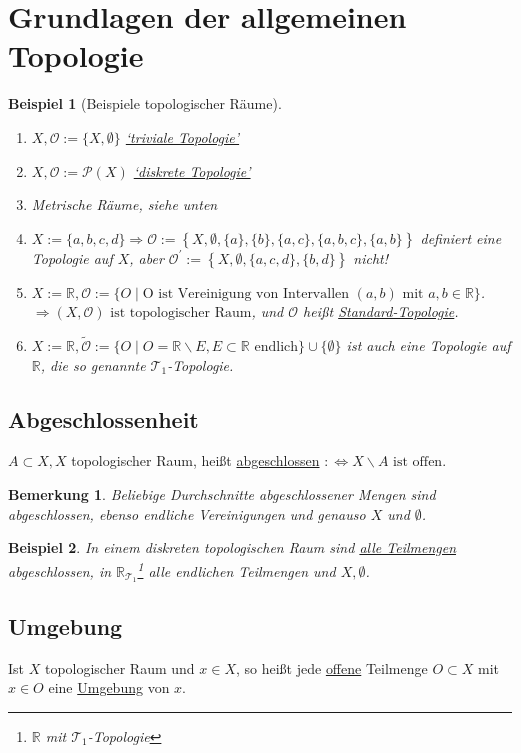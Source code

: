 \documentclass[a4paper,11pt,notitlepage]{report}
\newtheorem{remark}{Bemerkung}[chapter]
\newtheorem{example}{Beispiel}[chapter]
\newcommand{\R}{{\ensuremath{\mathbb{R}}}}
\newcommand{\OO}{{\ensuremath{\mathcal{O}}}}
\newenvironment{Kasten}[1]
{
\hspace{0.05\linewidth}
\begin{center}
\begin{minipage}{0.9\linewidth}
\setlength{\fboxsep}{10pt}
\definecolor{shadecolor}{gray}{1}
\definecolor{framecolor}{gray}{0}
\def\FrameCommand{\fcolorbox{framecolor}{shadecolor}}
\MakeFramed {\FrameRestore}
\subsection{#1}
\begin{itshape}
}
{
\end{itshape}
\endMakeFramed
\end{minipage}
\end{center}
}
\begin{document}
\section{Grundlagen der allgemeinen Topologie}
\begin{example}[Beispiele topologischer Räume]
	\begin{enumerate}[(1)]
		\item $X, \OO := \{X, \emptyset\}$ \underline{`triviale Topologie'}
		\item $X, \OO := \mathcal{P}(X)$ \underline{`diskrete Topologie'}
		\item Metrische Räume, siehe unten
		\item $X:= \{a,b,c,d\} \Rightarrow \OO := \left\{X, \emptyset, \{a\}, \{b\}, \{a,c\}, \{a,b,c\}, \{a,b\} \right \}$ definiert eine Topologie auf $X$, aber $\OO^\prime:= \left \{ X, \emptyset, \{a,c,d\}, \{b,d\} \right \}$ nicht!
		\item $X := \R, \OO := \{O \mid \text{O ist Vereinigung von Intervallen } (a,b) \text{ mit } a,b \in \R\}$. $\Rightarrow (X, \OO) \text{ ist topologischer Raum}$, und $\OO$ heißt \underline{Standard-Topologie}.
		\item $X:= \R, \tilde{\OO} := \{O \mid O = \R \backslash E, E \subset \R \text{ endlich}\} \cup \{\emptyset\}$ ist auch eine Topologie auf $\R$, die so genannte $\mathcal{T}_1$-Topologie.
	\end{enumerate}
\end{example}

\begin{Kasten}{Abgeschlossenheit}
	$A \subset X, X$ topologischer Raum, heißt \underline{abgeschlossen} $:\Leftrightarrow X \backslash A \text{ ist offen}$.
\end{Kasten}

\begin{remark}
	Beliebige Durchschnitte abgeschlossener Mengen sind abgeschlossen, ebenso endliche Vereinigungen und genauso $X$ und $\emptyset$.
\end{remark}

\begin{example}
	In einem diskreten topologischen Raum sind \underline{alle Teilmengen} abgeschlossen, in $\R_{\mathcal{T}_1}$\footnote{$\R$ mit $\mathcal{T}_1$-Topologie} alle endlichen Teilmengen und $X, \emptyset$.
\end{example}

\begin{Kasten}{Umgebung}
	Ist $X$ topologischer Raum und $x \in X$, so heißt jede \underline{offene} Teilmenge $O \subset X$ mit $x \in O$ eine \underline{Umgebung} von $x$.
\end{Kasten}
\end{document}

